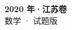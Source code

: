 \documentclass[zihao=-4, a4paper]{ctexart}
\begin{document}
\begin{center}
  {\Large\bfseries 2020 年·江苏卷}\\[4pt]
  {\large 数学 · 试题版}
\end{center}
\medskip
{}

\end{document}
